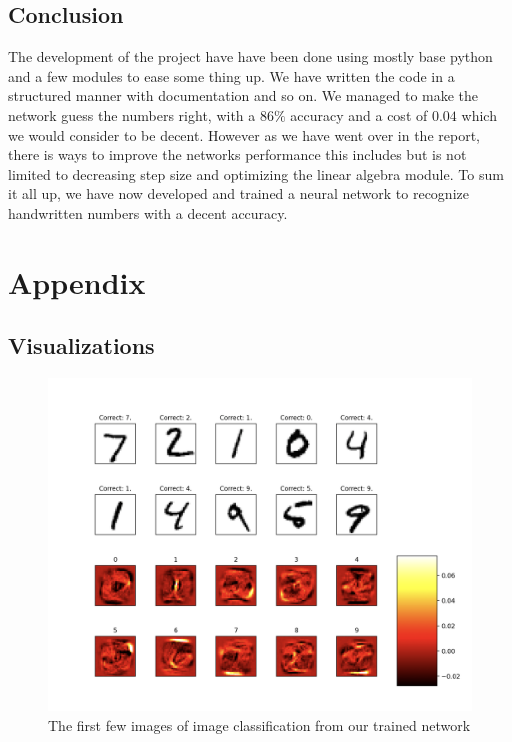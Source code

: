 \documentclass[a4paper,oneside,article,english]{memoir}
\begin{document}
\section{Conclusion}
The development of the project have have been done using mostly base python and a few modules to ease some thing up. 
We have written the code in a structured manner with documentation and so on. We managed to make the network guess 
the numbers right, with a $86\%$ accuracy and a cost of $0.04$ which we would consider to be decent. However as we have 
went over in the report, there is ways to improve the networks performance this includes but is not limited to decreasing 
step size and optimizing the linear algebra module. To sum it all up, we have now developed and trained a neural network 
to recognize handwritten numbers with a decent accuracy.
\newpage
\chapter{Appendix}  
\label{ch:appendix}

\section{Visualizations}
\label{sec:Visualizations}
\begin{figure}[H]
    \centering
    \includegraphics[scale = 0.4]{plot_image_eval.png}
    \caption{The first few images of image classification from our trained network}
    \label{fig:evaluation}
\end{figure}
\end{document}
